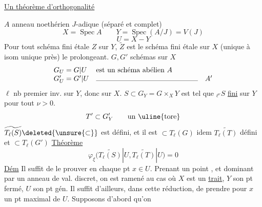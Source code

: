 \uline{Un théorème d'orthogonalité}

$A$ anneau noethérien $J$-adique (séparé et complet)
\[
X=\operatorname{Spec}A\qquad
Y=\operatorname{Spec}(A/J)=V(J)
\]
\[
U=X-Y
\]
Pour tout schéma fini étale $Z$ sur $Y$, $\widetilde Z$ est le schéma fini étale sur $X$ (unique à isom unique près) le prolongeant.
$G,G'$ schémas    sur $X$ 
\[
\begin{array}{ll}
G_U=G|U&\text{est un schéma abélien }A\\
G'_U=G'|U&\text{\rule{5cm}{.3pt}}\quad A'
\end{array}
\]
$\ell$  nb premier inv. sur $Y$, donc sur $X$.
$S\subset G_Y=G\times_XY$ est  tel que ${}_{\ell^\nu}S$ \uline{fini} sur $Y$ pour tout $\nu>0$.
\[
T'\subset G'_Y\qquad\text{un \uline{tore}}
\]
$\widetilde{T_\ell(S)}\deleted{\unsure{\subset}}$ est défini, et il est $\subset T_\ell(G)$
idem $\widetilde{T_\ell(T)}$ défini et $\subset T_\ell(G')$
\uline{Théorème}
\[
\varphi_\xi\bigl(\widetilde{T_\ell(S)}|U,\widetilde{T_\ell(T)}|U\bigr)=0
\]
\uline{Dém} Il suffit de le prouver en chaque pt $x\in U$.
Prenant un point  , et dominant par un anneau de val. discret, on est ramené au cas où $X$ est un \uline{trait}, $Y$ son pt fermé, $U$ son pt gén. Il suffit d'ailleurs, dans cette réduction, de prendre pour $x$ un pt maximal de $U$. Supposons  d'abord qu'on
